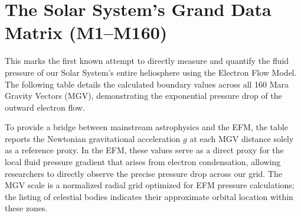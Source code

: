 \documentclass[11pt, a4paper]{article}
\begin{document}
\begin{table}[!ht]
  \centering
  \caption{Expanded Small-Body Populations --- Mara Gravity Vectors, Orbital Parameters \& Spin Data}
\end{table}

\newpage
\section{The Solar System's Grand Data Matrix (M1--M160)}
  This marks the first known attempt to directly measure and quantify the fluid pressure of our Solar System's entire heliosphere using the Electron Flow Model. The following table details the calculated boundary values across all 160 Mara Gravity Vectors (MGV), demonstrating the exponential pressure drop of the outward electron flow.
  
  To provide a bridge between mainstream astrophysics and the EFM, the table reports the Newtonian gravitational acceleration $g$ at each MGV distance solely as a reference proxy. In the EFM, these values serve as a direct proxy for the local fluid pressure gradient that arises from electron condensation, allowing researchers to directly observe the precise pressure drop across our grid. The MGV scale is a normalized radial grid optimized for EFM pressure calculations; the listing of celestial bodies indicates their approximate orbital location within these zones.
  
\end{document}
